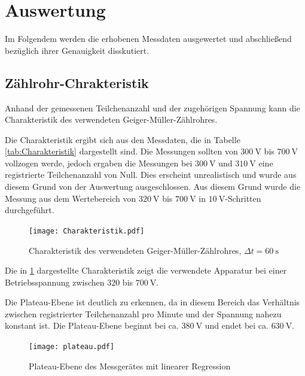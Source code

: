 



\section{Auswertung}

Im Folgendem werden die erhobenen Messdaten ausgewertet und abschließend
bezüglich ihrer Genauigkeit disskutiert.

\subsection{Zählrohr-Chrakteristik}

Anhand der gemessenen Teilchenanzahl und der zugehörigen Spannung kann die
Charakteristik des verwendeten Geiger-Müller-Zählrohres.

Die Charakteristik ergibt sich aus den Messdaten, die in Tabelle \ref{tab:Charakteristik}
dargestellt sind. Die Messungen sollten von $\SI{300}{\volt}$ bis $\SI{700}{\volt}$
vollzogen werde, jedoch ergaben die Messungen bei $\SI{300}{\volt}$ und
$\SI{310}{\volt}$ eine registrierte Teilchenanzahl von Null.
Dies erscheint unrealistisch und wurde aus diesem Grund von der Auswertung
ausgeschlossen. Aus diesem Grund wurde die Messung aus dem Wertebereich
von $\SI{320}{\volt}$ bis $\SI{700}{\volt}$ in $\SI{10}{\volt}$-Schritten
durchgeführt.

\begin{figure}
  \centering
  \texttt{[image: Charakteristik.pdf]}
  \caption{Charakteristik des verwendeten Geiger-Müller-Zählrohres, $\Delta t = \SI{60}{\second}$}
  \label{fig:Charakteristik}
\end{figure}

Die in \ref{fig:Charakteristik} dargestellte Charakteristik zeigt die verwendete
Apparatur bei einer Betriebsspannung zwischen $\num{320}$ bis $\SI{700}{\volt}$.

Die Plateau-Ebene ist deutlich zu erkennen, da in diesem Bereich das Verhältnis zwischen
registrierter Teilchenanzahl pro Minute und der Spannung nahezu konstant ist.
Die Plateau-Ebene beginnt bei ca. $\SI{380}{\volt}$ und endet bei ca.
$\SI{630}{\volt}$.

\begin{figure}
  \centering
  \texttt{[image: plateau.pdf]}
  \caption{Plateau-Ebene des Messgerätes mit linearer Regression}
  \label{fig:Plateau}
\end{figure}

